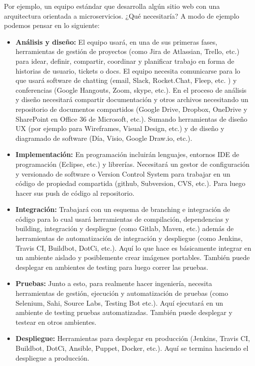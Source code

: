 Por ejemplo, un equipo estándar que desarrolla algún sitio web con una arquitectura orientada a microservicios. ¿Qué necesitaría? A modo de ejemplo podemos pensar en lo siguiente:
\begin{itemize}

\item \textbf{Análisis y diseño:} El equipo usará, en una de sus primeras fases, herramientas de gestión de proyectos (como Jira de Atlassian, Trello, etc.) para idear, definir, compartir, coordinar y planificar trabajo en forma de historias de usuario, tickets o docs. El equipo necesita comunicarse para lo que usará software de chatting (email, Slack, Rocket.Chat, Fleep, etc. ) y conferencias (Google Hangouts, Zoom, skype, etc.). En el proceso de análisis y diseño necesitará compartir documentación y otros archivos necesitando un repositorio de documentos compartidos (Google Drive, Dropbox, OneDrive y SharePoint en Office 36 de Microsoft, etc.). Sumando herramientas de diseño UX (por ejemplo para Wireframes, Visual Design, etc.) y de diseño y diagramado de software (Día, Visio, Google Draw.io, etc.). 

\item \textbf{Implementación:} En programación incluirán lenguajes, entornos IDE de programación (Eclipse, etc.) y librerías. Necesitará un gestor de configuración y versionado de software o Version Control System para trabajar en un código de propiedad compartida (github, Subversion, CVS, etc.). Para luego hacer sus push de código al repositorio.

\item \textbf{Integración:} Trabajará con un esquema de branching e integración de código para lo cual usará herramientas de compilación, dependencias y building, integración y despliegue (como Gitlab, Maven, etc.) además de herramientas de automatización de integración y despliegue (como Jenkins, Travis CI, Buildbot, DotCi, etc.). Aquí lo que hace es básicamente integrar en un ambiente aislado y posiblemente crear imágenes portables. También puede desplegar en ambientes de testing para luego correr las pruebas.

\item \textbf{Pruebas:} Junto a esto, para realmente hacer ingeniería, necesita herramientas de gestión, ejecución y automatización de pruebas (como Selenium, Sahi, Source Labs, Testing Bot etc.). Aquí ejecutará en un ambiente de testing pruebas automatizadas. También puede desplegar y testear en otros ambientes.

\item \textbf{Despliegue:} Herramientas para desplegar en producción (Jenkins, Travis CI, Buildbot, DotCi, Ansible, Puppet, Docker, etc.). Aquí se termina haciendo el despliegue a producción.


\end{itemize}
